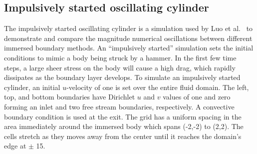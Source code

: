 \documentclass[preprint,12pt]{elsarticle}
\begin{document}
\subsection{Impulsively started oscillating cylinder}
\label{sec:osccylinder}
The impulsively started oscillating cylinder is a simulation used by Luo et al.~\cite{Luo:2012gx} to demonstrate and compare the magnitude numerical oscillations between different immersed boundary methods. 
An ``impulsively started'' simulation sets the initial conditions to mimic a body being struck by a hammer. 
In the first few time steps, a large sheer stress on the body will cause a high drag, which rapidly dissipates as the boundary layer develops. 
To simulate an impulsively started cylinder, an initial $u$-velocity of one is set over the entire fluid domain. 
The left, top, and bottom boundaries have Dirichlet $u$ and $v$ values of one and zero forming an inlet and two free stream boundaries, respectively. 
A convective boundary condition is used at the exit. 
The grid has a uniform spacing in the area immediately around the immersed body which spans (-2,-2) to (2,2). 
The cells stretch as they moves away from the center until it reaches the domain's edge at $\pm$ 15. 
\end{document}
